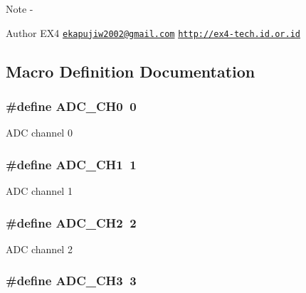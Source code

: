 \begin{DoxyNote}{Note}
-\/ 
\end{DoxyNote}
\begin{DoxyAuthor}{Author}
E\-X4 \href{mailto:ekapujiw2002@gmail.com}{\tt ekapujiw2002@gmail.\-com} \href{http://ex4-tech.id.or.id}{\tt http\-://ex4-\/tech.\-id.\-or.\-id} 
\end{DoxyAuthor}


\subsection{Macro Definition Documentation}
\hypertarget{group__ex4__adc_ga1e33b83bfcf4433eb2e8c6e818b5dff8}{
\subsubsection[{A\-D\-C\-\_\-\-C\-H0}]{\setlength{\rightskip}{0pt plus 5cm}\#define A\-D\-C\-\_\-\-C\-H0~0}}\label{group__ex4__adc_ga1e33b83bfcf4433eb2e8c6e818b5dff8}
A\-D\-C channel 0 \hypertarget{group__ex4__adc_ga7d351ed34ca3ff55d1681ee84a243090}{
\subsubsection[{A\-D\-C\-\_\-\-C\-H1}]{\setlength{\rightskip}{0pt plus 5cm}\#define A\-D\-C\-\_\-\-C\-H1~1}}\label{group__ex4__adc_ga7d351ed34ca3ff55d1681ee84a243090}
A\-D\-C channel 1 \hypertarget{group__ex4__adc_ga2bb0c1b2de3aa355244417d9a42a8966}{
\subsubsection[{A\-D\-C\-\_\-\-C\-H2}]{\setlength{\rightskip}{0pt plus 5cm}\#define A\-D\-C\-\_\-\-C\-H2~2}}\label{group__ex4__adc_ga2bb0c1b2de3aa355244417d9a42a8966}
A\-D\-C channel 2 \hypertarget{group__ex4__adc_ga6ae98bab335f9d073a58d70e7ba4f844}{
\subsubsection[{A\-D\-C\-\_\-\-C\-H3}]{\setlength{\rightskip}{0pt plus 5cm}\#define A\-D\-C\-\_\-\-C\-H3~3}}\label{group__ex4__adc_ga6ae98bab335f9d073a58d70e7ba4f844}
